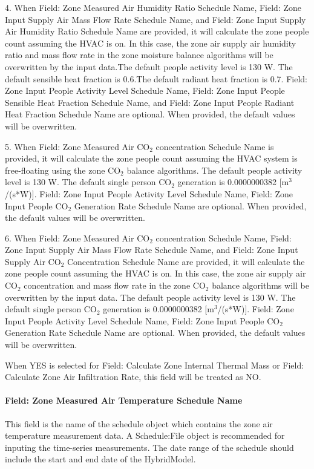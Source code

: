 4. When Field: Zone Measured Air Humidity Ratio Schedule Name, Field: Zone Input Supply Air Mass Flow Rate Schedule Name, and Field: Zone Input Supply Air Humidity Ratio Schedule Name are provided, it will calculate the zone people count assuming the HVAC is on. In this case, the zone air supply air humidity ratio and mass flow rate in the zone moisture balance algorithms will be overwritten by the input data.The default people activity level is 130 W. The default sensible heat fraction is 0.6.The default radiant heat fraction is 0.7. Field: Zone Input People Activity Level Schedule Name, Field: Zone Input People Sensible Heat Fraction Schedule Name, and Field: Zone Input People Radiant Heat Fraction Schedule Name are optional. When provided, the default values will be overwritten.

5. When Field: Zone Measured Air CO$_2$ concentration Schedule Name is provided, it will calculate the zone people count assuming the HVAC system is free-floating using the zone CO$_2$ balance algorithms. The default people activity level is 130 W. The default single person CO$_2$ generation is 0.0000000382 [m$^3$/(s*W)]. Field: Zone Input People Activity Level Schedule Name, Field: Zone Input People CO$_2$ Generation Rate Schedule Name are optional. When provided, the default values will be overwritten.

6. When Field: Zone Measured Air CO$_2$ concentration Schedule Name, Field: Zone Input Supply Air Mass Flow Rate Schedule Name, and Field: Zone Input Supply Air CO$_2$ Concentration Schedule Name are provided, it will calculate the zone people count assuming the HVAC is on. In this case, the zone air supply air CO$_2$ concentration and mass flow rate in the zone CO$_2$ balance algorithms will be overwritten by the input data. The default people activity level is 130 W. The default single person CO$_2$ generation is 0.0000000382 [m$^3$/(s*W)]. Field: Zone Input People Activity Level Schedule Name, Field: Zone Input People CO$_2$ Generation Rate Schedule Name are optional. When provided, the default values will be overwritten.

When YES is selected for Field: Calculate Zone Internal Thermal Mass or Field: Calculate Zone Air Infiltration Rate, this field will be treated as NO.

\paragraph{Field: Zone Measured Air Temperature Schedule Name}\label{field-zone-measured-air-temperature-schedule-name-hm}
This field is the name of the schedule object which contains the zone air temperature measurement data. A Schedule:File object is recommended for inputing the time-series measurements. The date range of the schedule should include the start and end date of the HybridModel.


